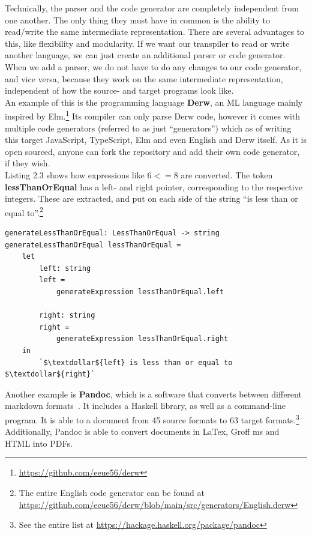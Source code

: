 Technically, the parser and the code generator are completely independent from one another. The only thing they must have in common is the ability to read/write the same intermediate representation. There are several advantages to this, like flexibility and modularity. If we want our transpiler to read or write another language, we can just create an additional parser or code generator. When we add a parser, we do not have to do any changes to our code generator, and vice versa, because they work on the same intermediate representation, independent of how the source- and target programs look like. \hfill \\

An example of this is the programming language \textbf{Derw}, an ML language mainly inspired by Elm.\footnote{\url{https://github.com/eeue56/derw}} Its compiler can only parse Derw code, however it comes with multiple code generators (referred to as just ``generators'') which as of writing this target JavaScript, TypeScript, Elm and even English and Derw itself. As it is open sourced, anyone can fork the repository and add their own code generator, if they wish. \hfill \\

Listing 2.3 shows how expressions like $6 <= 8$ are converted. The token \textbf{lessThanOrEqual} has a left- and right pointer, corresponding to the respective integers. These are extracted, and put on each side of the string ``is less than or equal to''.\footnote{The entire English code generator can be found at \url{https://github.com/eeue56/derw/blob/main/src/generators/English.derw}} \hfill \\

\begin{lstlisting}[caption={The function that converts a ``less than or equal''-expression in Derw to English}, captionpos=b]
generateLessThanOrEqual: LessThanOrEqual -> string
generateLessThanOrEqual lessThanOrEqual =
    let
        left: string
        left =
            generateExpression lessThanOrEqual.left

        right: string
        right =
            generateExpression lessThanOrEqual.right
    in
        `$\textdollar${left} is less than or equal to $\textdollar${right}`
\end{lstlisting}

Another example is \textbf{Pandoc}, which is a software that converts between different markdown formats~\cite{dominici2014}. It includes a Haskell library, as well as a command-line program. It is able to a document from 45 source formats to 63 target formats.\footnote{See the entire list at \url{https://hackage.haskell.org/package/pandoc}} Additionally, Pandoc is able to convert documents in LaTex, Groff ms and HTML into PDFs. \hfill \\

